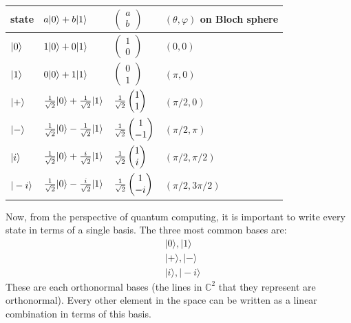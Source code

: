 \documentclass{article}
\theoremstyle{plain}
\theoremstyle{definition}
\theoremstyle{remark}
\numberwithin{theorem}{section}
\newcommand{\CC}{\mathbb{C}}
\begin{document}
\begin{tabular}{l | l | l | l }
	state & $a|0 \rangle + b|1\rangle$ & $\begin{pmatrix}a \\ b \end{pmatrix}$ & $(\theta, \varphi)$ on Bloch sphere \\
	\hline
	$|0 \rangle$ & $1 |0 \rangle + 0 |1\rangle$ & $\begin{pmatrix}1 \\ 0 \end{pmatrix}$ & $(0,0)$ \\
	$|1\rangle$ & $0 |0 \rangle + 1 |1\rangle$ & $\begin{pmatrix}0 \\ 1 \end{pmatrix}$ & $(\pi,0)$ \\
	$|+\rangle$ & $\frac{1}{\sqrt{2}} |0 \rangle + \frac{1}{\sqrt{2}} |1\rangle$ & $\frac{1}{\sqrt{2}}\begin{pmatrix}1 \\ 1 \end{pmatrix}$ & $(\pi/2,0)$ \\
	$|-\rangle$ & $\frac{1}{\sqrt{2}} |0 \rangle - \frac{1}{\sqrt{2}} |1\rangle$ & $\frac{1}{\sqrt{2}}\begin{pmatrix}1 \\ -1 \end{pmatrix}$  & $(\pi/2,\pi)$ \\
	$|i\rangle$ & $\frac{1}{\sqrt{2}} |0 \rangle + \frac{i}{\sqrt{2}} |1\rangle$ & $\frac{1}{\sqrt{2}}\begin{pmatrix}1 \\ i \end{pmatrix}$  & $(\pi/2,\pi/2)$ \\
	$|-i\rangle$ & $\frac{1}{\sqrt{2}} |0 \rangle - \frac{i}{\sqrt{2}} |1\rangle$ & $\frac{1}{\sqrt{2}}\begin{pmatrix}1 \\ -i \end{pmatrix}$ & $(\pi/2,3\pi/2)$ \\
\end{tabular}

Now, from the perspective of quantum computing, it is important to write every state in terms of a single basis.  The three most common bases are:
\begin{align*}
&| 0 \rangle, |1\rangle \\
&| + \rangle, |-\rangle \\
&| i \rangle, |-i\rangle 
\end{align*}
These are each orthonormal bases (the lines in $\CC^2$ that they represent are orthonormal).  Every other element in the space can be written as a linear combination in terms of this basis.  
\end{document}
